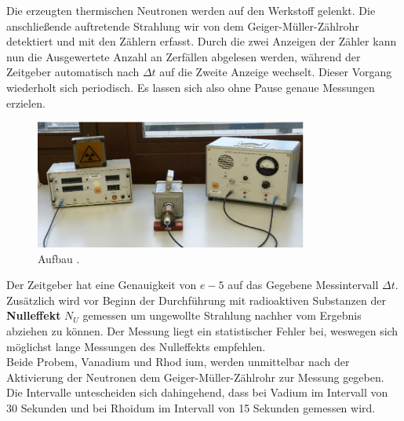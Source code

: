 Die erzeugten thermischen Neutronen %
werden auf den Werkstoff gelenkt. Die anschließende auftretende Strahlung wir von  dem Geiger-Müller-Zählrohr detektiert und mit den Zählern erfasst.
Durch die zwei Anzeigen der Zähler kann nun die Ausgewertete Anzahl an Zerfällen abgelesen werden, während der Zeitgeber automatisch nach $\Delta t$ auf die Zweite Anzeige wechselt.
Dieser Vorgang wiederholt sich periodisch. Es lassen sich also ohne Pause genaue Messungen erzielen.

\begin{figure}
  \centering
  \includegraphics[width=0.8\textwidth]{bilder/Screenshot 2021-01-22 103203.png}
  \caption{Aufbau  \cite{hinweis}.}
  \label{fig:aufbau}
\end{figure}

Der Zeitgeber hat eine Genauigkeit von $\si{e-5}$ auf das Gegebene Messintervall $\Delta t$.
Zusätzlich wird vor Beginn der Durchführung mit radioaktiven Substanzen der \textbf{Nulleffekt} $N_U$ %
gemessen um ungewollte Strahlung nachher vom Ergebnis abziehen zu können.  Der Messung liegt ein statistischer Fehler bei, weswegen sich möglichst lange Messungen des Nulleffekts empfehlen.
\\
\newline
Beide Probem, Vanadium und Rhod ium, werden unmittelbar nach der Aktivierung der Neutronen dem Geiger-Müller-Zählrohr zur Messung gegeben.
Die Intervalle untescheiden sich dahingehend, dass bei Vadium im Intervall von 30 Sekunden und bei Rhoidum im Intervall von 15 Sekunden gemessen wird.


